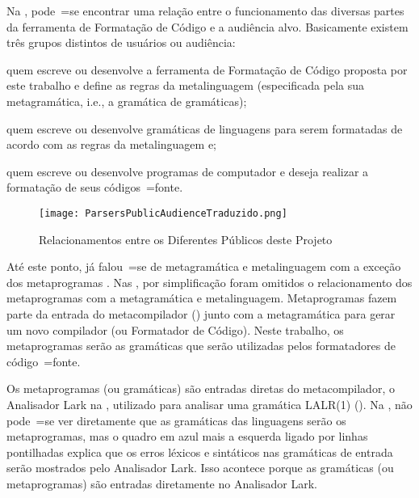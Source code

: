 Na ,
pode~=se encontrar uma relação entre o funcionamento das diversas partes da ferramenta de Formatação de Código e
a audiência alvo.
Basicamente existem três grupos distintos de usuários ou
audiência:
\begin{inparaenum}[1)]
\item quem escreve ou
desenvolve a ferramenta de Formatação de Código proposta por este trabalho e
define as regras da metalinguagem (especificada pela sua metagramática,
i.e.,
a gramática de gramáticas);
\item quem escreve ou
desenvolve gramáticas de linguagens para serem formatadas de acordo com as regras da metalinguagem e;
\item quem escreve ou
desenvolve programas de computador e
deseja realizar a formatação de seus códigos~=fonte.
\end{inparaenum}%
\begin{figure}[!htb]
\caption{Relacionamentos entre os Diferentes Públicos deste Projeto}
\label{ParsersPublicAudienceTraduzido}
\centering
\texttt{[image: ParsersPublicAudienceTraduzido.png]}
\end{figure}

Até este ponto,
já falou~=se de metagramática e
metalinguagem com a exceção dos metaprogramas \cite{tradeoffsInMetaprogramming}.
Nas ,
por simplificação foram omitidos o relacionamento dos metaprogramas com a metagramática e
metalinguagem.
Metaprogramas fazem parte da entrada do metacompilador () junto com a metagramática para gerar um novo compilador (ou Formatador de Código).
Neste trabalho,
os metaprogramas serão as gramáticas que serão utilizadas pelos formatadores de código~=fonte.

Os metaprogramas (ou gramáticas) são entradas diretas do metacompilador,
o Analisador Lark na ,
utilizado para analisar uma gramática LALR(1) ().
Na ,
não pode~=se ver diretamente que as gramáticas das linguagens serão os metaprogramas,
mas o quadro em azul mais a esquerda ligado por linhas pontilhadas explica que os erros léxicos e
sintáticos nas gramáticas de entrada serão mostrados pelo Analisador Lark.
Isso acontece porque as gramáticas (ou metaprogramas) são entradas diretamente no Analisador Lark.

